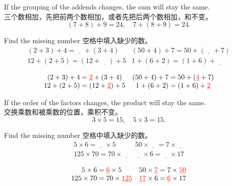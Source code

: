 \begin{newprop}
If the grouping of the addends changes, the sum will stay the same. \\
三个数相加，先把前两个数相加，或者先把后两个数相加，和不变。
$$
(7+8)+9 = 24, \quad 7+(8+9) = 24.
$$
\end{newprop}

\begin{example}
Find the missing number 空格中填入缺少的数。
$$
\begin{matrix}
(2+3)+4= \underline{\quad} + (3+4) & (50+4)+7 = 50+(\underline{\quad}+7)\\
12+(2+5) = (12+\underline{\quad}) + 5 & 1+(6+2) = (1+6)+\underline{\quad}
\end{matrix}
$$
\end{example}
\begin{solution}
$$
\begin{matrix}
(2+3)+4= \underline{\color{red} 2} + (3+4) & (50+4)+7 = 50+(\underline{\color{red} 4}+7)\\
12+(2+5) = (12+\underline{\color{red} 2}) + 5 & 1+(6+2) = (1+6)+\underline{\color{red} 2}
\end{matrix}
$$
\end{solution}

\begin{newprop}
If the order of the factors changes, the product will stay the same.\\
交换乘数和被乘数的位置，乘积不变。
$$
3\times 5 = 15, \quad 5\times 3 = 15.
$$
\end{newprop}
\newpage
\begin{example}
Find the missing number 空格中填入缺少的数。
$$
\begin{matrix}
5\times6 = \underline{\quad} \times 5 & 50\times  \underline{\quad} = 7\times\underline{\quad} \\
125\times70 = 70\times \underline{\quad} & \underline{\quad} \times 6 = \underline{\quad} \times 17
\end{matrix}
$$
\end{example}
\begin{solution}
$$
\begin{matrix}
5\times6 = \underline{\color{red} 6} \times 5 & 50\times  \underline{\color{red} 7} = 7\times\underline{\color{red} 50} \\
125\times70 = 70\times \underline{\color{red} 125} & \underline{\color{red} 17} \times 6 = \underline{\color{red} 6} \times 17
\end{matrix}
$$
\end{solution}

